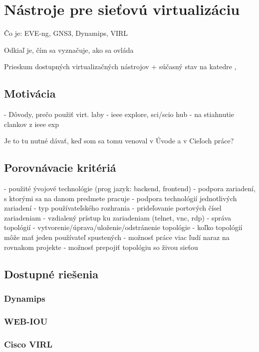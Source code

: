 \chapter{Nástroje pre sieťovú virtualizáciu}

Čo je:
EVE-ng, GNS3, Dynamips, VIRL 

Odkiaľ je, čím sa vyznačuje, ako sa ovláda

Prieskum dostupných virtualizačných nástrojov + súčasný stav na katedre \cite{pes2} \cite{bartsch2}, \cite{berman, wolfram}

\section{Motivácia}
- Dôvody, prečo použiť virt. laby
  - ieee explore, sci/scio hub - na stiahnutie clankov z ieee exp
  
  Je to tu nutné dávať, keď som sa tomu venoval v Úvode a v Cieľoch práce?
  
\section{Porovnávacie kritériá}

- použité ývojové technológie (prog jazyk: backend, frontend)
- podpora zariadení, s ktorými sa na danom predmete pracuje
- podpora technológií jednotlivých zariadení
- typ používateľského rozhrania
- prideľovanie portových čísel zariadeniam
- vzdialený prístup ku zariadeniam (telnet, vnc, rdp)
- správa topológií
  - vytvorenie/úprava/uloženie/odstránenie topológie
  - koľko topológií môže mať jeden používateľ spustených
- možnosť práce viac ľudí naraz na rovnakom projekte
- možnosť prepojiť topológiu so živou sieťou


\section{Dostupné riešenia}

\subsection{Dynamips}

\subsection{WEB-IOU}

\subsection{Cisco VIRL}

